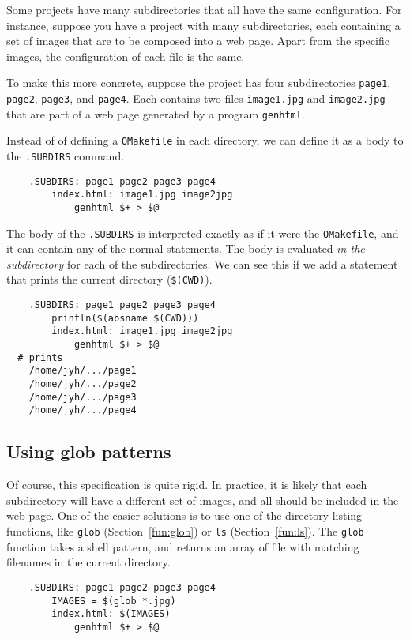 Some projects have many subdirectories that all have the same configuration.  For instance, suppose
you have a project with many subdirectories, each containing a set of images that are to be composed
into a web page.  Apart from the specific images, the configuration of each file is the same.

To make this more concrete, suppose the project has four subdirectories \verb+page1+, \verb+page2+,
\verb+page3+, and \verb+page4+.  Each contains two files \verb+image1.jpg+ and \verb+image2.jpg+
that are part of a web page generated by a program \verb+genhtml+.

Instead of of defining a \verb+OMakefile+ in each directory, we can define it as a body to the
\verb+.SUBDIRS+ command.

\begin{verbatim}
    .SUBDIRS: page1 page2 page3 page4
        index.html: image1.jpg image2jpg
            genhtml $+ > $@
\end{verbatim}

The body of the \verb+.SUBDIRS+ is interpreted exactly as if it were the \verb+OMakefile+, and it
can contain any of the normal statements.  The body is evaluated \emph{in the subdirectory} for each
of the subdirectories.  We can see this if we add a statement that prints the current directory
(\verb+$(CWD)+).

\begin{verbatim}
    .SUBDIRS: page1 page2 page3 page4
        println($(absname $(CWD)))
        index.html: image1.jpg image2jpg
            genhtml $+ > $@
  # prints
    /home/jyh/.../page1
    /home/jyh/.../page2
    /home/jyh/.../page3
    /home/jyh/.../page4
\end{verbatim}

\subsection{Using glob patterns}

Of course, this specification is quite rigid.  In practice, it is likely that each subdirectory will
have a different set of images, and all should be included in the web page.  One of the easier
solutions is to use one of the directory-listing functions, like
\verb+glob+ (Section~\ref{fun:glob}) or \verb+ls+ (Section~\ref{fun:ls}).
The \verb+glob+ function takes a shell pattern, and returns an array of
file with matching filenames in the current directory.

\begin{verbatim}
    .SUBDIRS: page1 page2 page3 page4
        IMAGES = $(glob *.jpg)
        index.html: $(IMAGES)
            genhtml $+ > $@
\end{verbatim}

